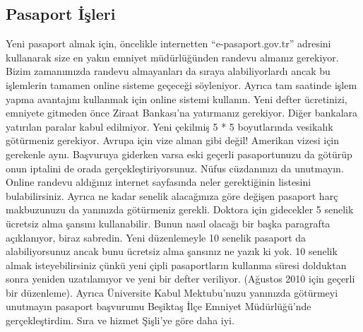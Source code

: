 \documentclass[12pt]{article}
\begin{document}
\subsection{Pasaport İşleri}
Yeni pasaport almak için, öncelikle internetten “e-pasaport.gov.tr” adresini kullanarak size en yakın emniyet müdürlüğünden randevu almanız gerekiyor. Bizim zamanımızda randevu almayanları da sıraya alabiliyorlardı ancak bu işlemlerin tamamen online sisteme geçeceği söyleniyor. Ayrıca tam saatinde işlem yapma avantajını kullanmak için online sistemi kullanın. Yeni defter ücretinizi, emniyete gitmeden önce Ziraat Bankası’na yatırmanız gerekiyor. Diğer bankalara yatırılan paralar kabul edilmiyor. Yeni çekilmiş 5 * 5 boyutlarında vesikalık götürmeniz gerekiyor. Avrupa için vize alınan gibi değil! Amerikan vizesi için gerekenle aynı. Başvuruya giderken varsa eski geçerli pasaportunuzu da götürüp onun iptalini de orada gerçekleştiriyorsunuz. Nüfus cüzdanınızı da unutmayın. Online randevu aldığınız internet sayfasında neler gerektiğinin listesini bulabilirsiniz. Ayrıca ne kadar senelik alacağınıza göre değişen pasaport harç makbuzunuzu da yanınızda götürmeniz gerekli. Doktora için gidecekler 5 senelik ücretsiz alma şansını kullanabilir. Bunun nasıl olacağı bir başka paragrafta açıklanıyor, biraz sabredin. Yeni düzenlemeyle 10 senelik pasaport da alabiliyorsunuz ancak bunu ücretsiz alma şansınız ne yazık ki yok. 10 senelik almak isteyebilirsiniz çünkü yeni çipli pasaportların kullanma süresi dolduktan sonra yeniden uzatılamıyor ve yeni bir defter veriliyor. (Ağustos 2010 için geçerli bir düzenleme). Ayrıca Üniversite Kabul Mektubu’nuzu yanınızda götürmeyi unutmayın pasaport başvurumu Beşiktaş İlçe Emniyet Müdürlüğü’nde gerçekleştirdim. Sıra ve hizmet Şişli’ye göre daha iyi.
\end{document}
